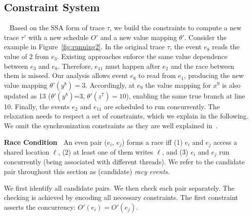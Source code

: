 




\subsection{Constraint System}~\label{sec:constraints}
Based on the SSA form of trace $\tau$, we build the constraints to 
compute a new trace $\tau'$ with a new schedule $O'$ and a new 
value mapping $\theta'$. Consider the example in Figure~\ref{fig:running2}. 
In the original trace $\tau$, the event $e_8$ reads the value of 
2 from $e_3$.  Existing 
approaches enforce the same value dependence between $e_3$ and $e_8$.
 Therefore, $e_{11}$ must happen after $e_2$ and the race between 
them is missed.
Our analysis allows event $e_8$ to read from $e_1$, producing the new 
value mapping $\theta'(y^8)=3$. Accordingly, at $e_9$ the value mapping 
for $x^9$ is also updated as 13 ($\theta'(y^8)$=3, $\theta'(z^7)=10$), 
enabling the same true branch at line 10. Finally, the 
events $e_2$ and $e_{11}$ are scheduled to run concurrently.  The 
relaxation needs to respect a set of constraints, which we explain in 
the following. We omit the synchronization constraints as they are well 
explained in~\cite{yannis, pldi14}.



{\bf Race Condition\ } An even pair 
($e_i$, $e_j$) forms a race iff (1) $e_i$ and $e_j$ access a shared
location $\ell$, (2) at least one of them writes $\ell$, and (3) $e_i$ and $e_j$ run concurrently (being associated with different threads). We refer to 
the candidate pair throughout this section as (candidate) \emph{racy events}.  

We first identify all candidate pairs.
We then check each pair separately.  The checking is achieved by encoding 
all necessary constraints.  The first constraint asserts the
concurrency:
$O'(e_i) = O'(e_{j})$.

